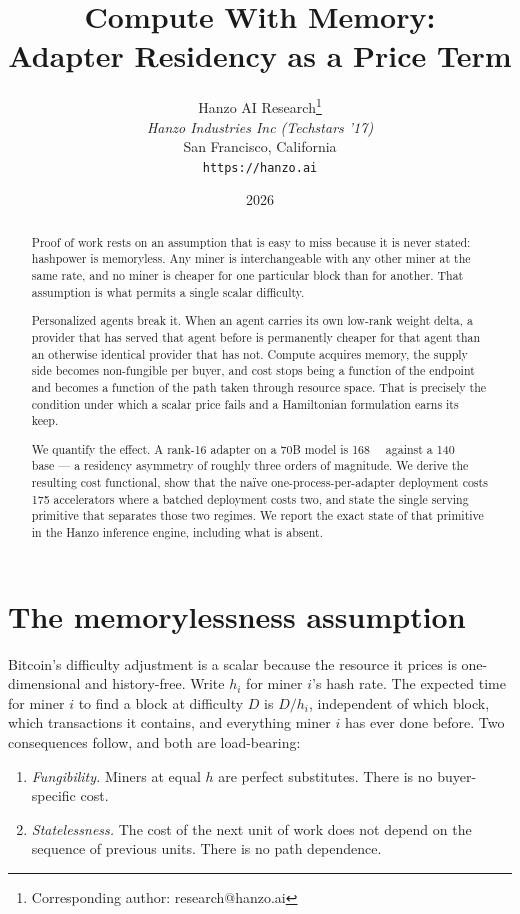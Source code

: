 \documentclass[11pt,a4paper]{article}
\title{Compute With Memory:\\Adapter Residency as a Price Term}
\author{
Hanzo AI Research\thanks{Corresponding author: research@hanzo.ai} \\
\textit{Hanzo Industries Inc (Techstars '17)} \\
San Francisco, California \\
\texttt{https://hanzo.ai}
}
\date{2026}
\begin{document}
\hanzocoverpage

\begin{abstract}
Proof of work rests on an assumption that is easy to miss because it is never
stated: hashpower is memoryless. Any miner is interchangeable with any other
miner at the same rate, and no miner is cheaper for one particular block than
for another. That assumption is what permits a single scalar difficulty.

Personalized agents break it. When an agent carries its own low-rank weight
delta, a provider that has served that agent before is permanently cheaper for
that agent than an otherwise identical provider that has not. Compute acquires
memory, the supply side becomes non-fungible per buyer, and cost stops being a
function of the endpoint and becomes a function of the path taken through
resource space. That is precisely the condition under which a scalar price
fails and a Hamiltonian formulation earns its keep.

We quantify the effect. A rank-16 adapter on a 70B model is
\SI{168}{\mega\byte} against a \SI{140}{\giga\byte} base --- a residency
asymmetry of roughly three orders of magnitude. We derive the resulting cost
functional, show that the na\"ive one-process-per-adapter deployment costs
\num{175} accelerators where a batched deployment costs two, and state the
single serving primitive that separates those two regimes. We report the exact
state of that primitive in the Hanzo inference engine, including what is absent.
\end{abstract}

\tableofcontents
\newpage

\section{The memorylessness assumption}

Bitcoin's difficulty adjustment is a scalar because the resource it prices is
one-dimensional and history-free. Write $h_i$ for miner $i$'s hash rate. The
expected time for miner $i$ to find a block at difficulty $D$ is $D/h_i$,
independent of which block, which transactions it contains, and everything
miner $i$ has ever done before. Two consequences follow, and both are load-bearing:

\begin{enumerate}[label=(\alph*)]
\item \emph{Fungibility.} Miners at equal $h$ are perfect substitutes. There is
no buyer-specific cost.
\item \emph{Statelessness.} The cost of the next unit of work does not depend on
the sequence of previous units. There is no path dependence.
\end{enumerate}
\end{document}
